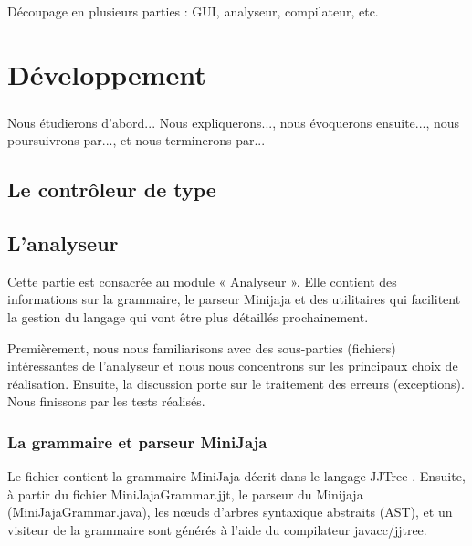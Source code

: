 \documentclass[a4paper,12pt]{report}
\begin{document}
\paragraph{}
Découpage en plusieurs parties : GUI, analyseur, compilateur, etc.

\chapter{Développement}
\paragraph{}
Nous étudierons d'abord... Nous expliquerons..., nous évoquerons ensuite..., nous poursuivrons par..., et nous terminerons par...
\section{Le contrôleur de type}
\paragraph{}

\section{L'analyseur}
Cette partie est consacrée au module « Analyseur ». Elle contient des informations sur la grammaire, le parseur Minijaja et des utilitaires qui facilitent la gestion du langage qui vont être plus détaillés prochainement.
 
Premièrement, nous nous familiarisons avec des sous-parties (fichiers) intéressantes de l’analyseur et nous nous concentrons sur les principaux choix de réalisation. Ensuite, la discussion porte sur le traitement des erreurs (exceptions). Nous finissons par les tests réalisés.

\subsection{La grammaire et parseur MiniJaja}
Le fichier contient la grammaire MiniJaja décrit dans le langage JJTree . Ensuite, à partir du fichier MiniJajaGrammar.jjt, le parseur du Minijaja (MiniJajaGrammar.java), les nœuds d'arbres syntaxique abstraits (AST), et un visiteur de la grammaire sont générés à l’aide du compilateur javacc/jjtree.
\end{document}
